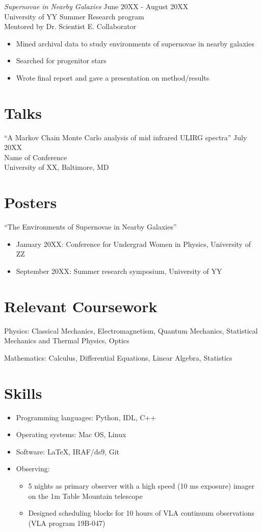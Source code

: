 \documentclass[resmargin, 10pt]{res} %
\begin{document}
\begin{resume}
{\sl Supernovae in Nearby Galaxies} \hfill June 20XX - August 20XX \\
University of YY Summer Research program \\
Mentored by Dr. Scientist E. Collaborator
\vspace{1mm}
\begin{itemize}\itemsep -2pt
\item Mined archival data to study environments of supernovae in nearby galaxies
\item Searched for progenitor stars
\item Wrote final report and gave a presentation on method/results
\end{itemize} 


\section{Talks}
``A Markov Chain Monte Carlo analysis of mid infrared ULIRG spectra'' \hfill July 20XX \\
Name of Conference\\
University of XX, Baltimore, MD


\section{Posters}
``The Environments of Supernovae in Nearby Galaxies''
\vspace{0.5em}
\begin{itemize} \itemsep -2pt
\item January 20XX: Conference for Undergrad Women in Physics, University of ZZ
\item September 20XX: Summer research symposium, University of YY
\end{itemize}


\section{Relevant Coursework}
Physics: Classical Mechanics, Electromagnetism, Quantum Mechanics, Statistical Mechanics and Thermal Physics, Optics

Mathematics: Calculus, Differential Equations, Linear Algebra, Statistics

\section{Skills}
\begin{itemize} \itemsep -2pt
\item Programming languages: Python, IDL, C++
\item Operating systems: Mac OS, Linux
\item Software: LaTeX, IRAF/ds9, Git
\item Observing: 
\begin{itemize}
\item 5 nights as primary observer with a high speed (10 ms exposure) imager on the 1m Table Mountain telescope 
\item Designed scheduling blocks for 10 hours of VLA continuum observations (VLA program 19B-047)
\end{itemize}



\end{itemize}
\end{resume}
\end{document}
